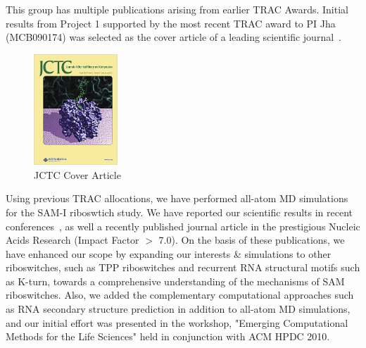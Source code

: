 \documentclass[a4paper,10pt]{article}
\begin{document}


This group has multiple publications arising from earlier TRAC Awards. Initial results from Project 1 supported by the most recent TRAC award to PI Jha (MCB090174) was selected as the cover article of a leading scientific journal~\cite{jctc_cover}.  \begin{figure}
 \includegraphics[width=0.28\textwidth]{jctc_cover2.png}
 \caption{\footnotesize JCTC Cover Article}
 \label{cover}
\end{figure}
Using previous TRAC allocations, we have performed all-atom MD simulations for the SAM-I riboswtich study.  We have reported our scientific results in recent conferences~\cite{ecmls10}, as well a recently published journal article in the prestigious Nucleic Acids Research\cite{SAM-I-NAR2009} (Impact Factor $>$ 7.0). On the basis of these publications, we have enhanced our scope by expanding our interests \& simulations to other riboswitches, such as TPP riboswitches and recurrent RNA structural motifs such as K-turn, towards a comprehensive understanding of the mechanisms of SAM riboswitches.  Also, we added the complementary computational approaches such as RNA secondary structure prediction in addition to all-atom MD simulations, and our initial effort was presented in the workshop, "Emerging Computational Methods for the Life Sciences" held in conjunction with ACM HPDC 2010\cite{ecmls10}.


\end{document}
